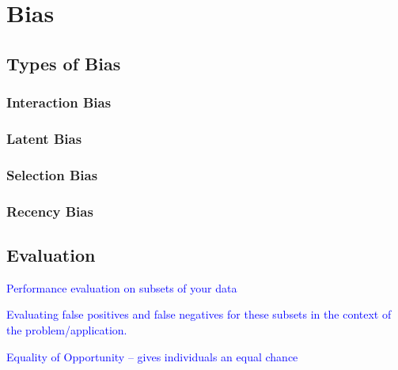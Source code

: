 \section{Bias}
\label{sec:data_bias_overview}

\subsection{Types of Bias}

\subsubsection{Interaction Bias}

\subsubsection{Latent Bias}

\subsubsection{Selection Bias}

\subsubsection{Recency Bias}

\subsection{Evaluation}

\textcolor{blue}{Performance evaluation on subsets of your data}

\textcolor{blue}{Evaluating false positives and false negatives for these subsets in the context of the problem/application.}

\textcolor{blue}{Equality of Opportunity -- gives individuals an equal chance}